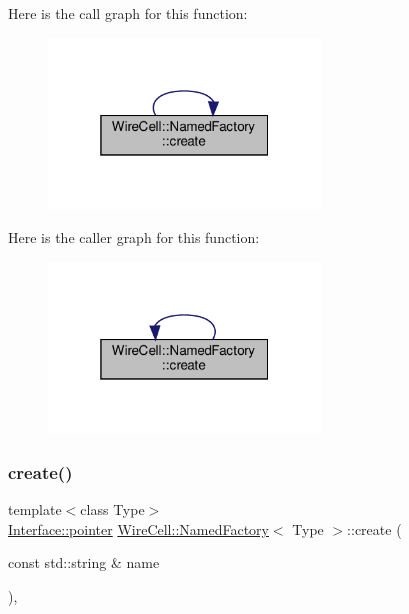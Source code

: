 Here is the call graph for this function\+:
\nopagebreak
\begin{figure}[H]
\begin{center}
\leavevmode
\includegraphics[width=205pt]{class_wire_cell_1_1_named_factory_a1f5abc7490577953e98a1bfd65671236_cgraph}
\end{center}
\end{figure}
Here is the caller graph for this function\+:
\nopagebreak
\begin{figure}[H]
\begin{center}
\leavevmode
\includegraphics[width=205pt]{class_wire_cell_1_1_named_factory_a1f5abc7490577953e98a1bfd65671236_icgraph}
\end{center}
\end{figure}
\mbox{\label{class_wire_cell_1_1_named_factory_aaf8b55bd335453198f23f412b8174419}} 
\subsubsection{\texorpdfstring{create()}{create()}\hspace{0.1cm}{\footnotesize\ttfamily [2/2]}}
{\footnotesize\ttfamily template$<$class Type$>$ \\
\hyperlink{class_wire_cell_1_1_interface_a09c548fb8266cfa39afb2e74a4615c37}{Interface\+::pointer} \hyperlink{class_wire_cell_1_1_named_factory}{Wire\+Cell\+::\+Named\+Factory}$<$ Type $>$\+::create (\begin{DoxyParamCaption}\item[{const std\+::string \&}]{name }\end{DoxyParamCaption})\hspace{0.3cm}{\ttfamily [inline]}, {\ttfamily [virtual]}}



